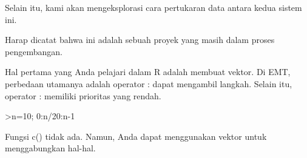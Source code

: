 \documentclass[a4paper,10pt]{article}
\begin{document}
\begin{eulernotebook}
\begin{eulercomment}
\begin{eulercomment}
\begin{eulercomment}
\begin{eulercomment}
\begin{eulercomment}
Selain itu, kami akan mengeksplorasi cara pertukaran data antara kedua
sistem ini.
\end{eulercomment}
\begin{eulercomment}
Harap dicatat bahwa ini adalah sebuah proyek yang masih dalam proses
pengembangan.
\end{eulercomment}
\begin{eulercomment}
Hal pertama yang Anda pelajari dalam R adalah membuat vektor. Di EMT,
perbedaan utamanya adalah operator : dapat mengambil langkah. Selain
itu, operator : memiliki prioritas yang rendah.
\end{eulercomment}
\begin{eulerprompt}
>n=10; 0:n/20:n-1
\end{eulerprompt}
\begin{euleroutput}
  [0,  0.5,  1,  1.5,  2,  2.5,  3,  3.5,  4,  4.5,  5,  5.5,  6,  6.5,
  7,  7.5,  8,  8.5,  9]
\end{euleroutput}
\begin{eulercomment}
Fungsi c() tidak ada. Namun, Anda dapat menggunakan vektor untuk
menggabungkan hal-hal.


\end{eulercomment}
\end{eulercomment}
\end{eulercomment}
\end{eulercomment}
\end{eulercomment}
\end{eulernotebook}
\end{document}
